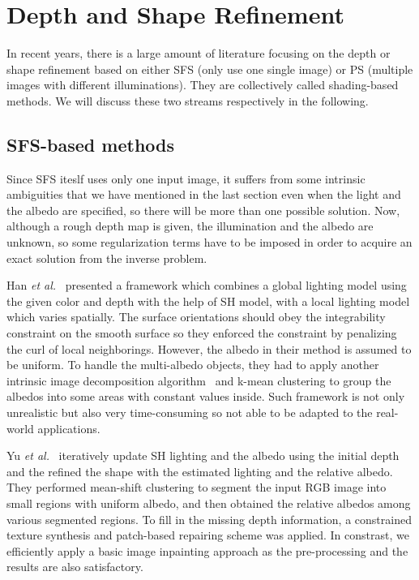  

\section{Depth and Shape Refinement}

In recent years, there is a large amount of literature focusing on the depth or shape refinement based on either SFS (only use one single image) or PS (multiple images with different illuminations).
They are collectively called shading-based methods.
We will discuss these two streams respectively in the following.
\subsection{SFS-based methods}
Since SFS iteslf uses only one input image, it suffers from some intrinsic ambiguities that we have mentioned in the last section even when the light and the albedo are specified, so there will be more than one possible solution.
Now, although a rough depth map is given, the illumination and the albedo are unknown, so some regularization terms have to be imposed in order to acquire an exact solution from the inverse problem.

Han \emph{et al.}~\cite{han2013high} presented a framework which combines a global lighting model using the given color and depth with the help of SH model, with a local lighting model which varies spatially. 
The surface orientations should obey the integrability constraint on the smooth surface so they enforced the constraint by penalizing the curl of local neighborings.
However, the albedo in their method is assumed to be uniform.
To handle the multi-albedo objects, they had to apply another intrinsic image decomposition algorithm~\cite{barron2011high} and k-mean clustering to group the albedos into some areas with constant values inside.
Such framework is not only unrealistic but also very time-consuming so not able to be adapted to the real-world applications.

Yu \emph{et al.}~\cite{yu2013shading} iteratively update SH lighting and the albedo using the initial depth and the refined the shape with the estimated lighting and the relative albedo. 
They performed mean-shift clustering to segment the input RGB image into small regions with uniform albedo, and then obtained the relative albedos among various segmented regions. 
To fill in the missing depth information, a constrained texture synthesis and patch-based repairing scheme was applied.
In constrast, we efficiently apply a basic image inpainting approach as the pre-processing and the results are also satisfactory.



